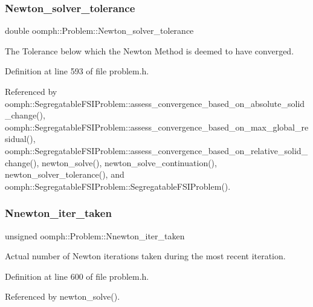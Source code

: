 \subsubsection{\texorpdfstring{Newton\+\_\+solver\+\_\+tolerance}{Newton\_solver\_tolerance}}
{\footnotesize\ttfamily double oomph\+::\+Problem\+::\+Newton\+\_\+solver\+\_\+tolerance\hspace{0.3cm}{\ttfamily [protected]}}



The Tolerance below which the Newton Method is deemed to have converged. 



Definition at line 593 of file problem.\+h.



Referenced by oomph\+::\+Segregatable\+F\+S\+I\+Problem\+::assess\+\_\+convergence\+\_\+based\+\_\+on\+\_\+absolute\+\_\+solid\+\_\+change(), oomph\+::\+Segregatable\+F\+S\+I\+Problem\+::assess\+\_\+convergence\+\_\+based\+\_\+on\+\_\+max\+\_\+global\+\_\+residual(), oomph\+::\+Segregatable\+F\+S\+I\+Problem\+::assess\+\_\+convergence\+\_\+based\+\_\+on\+\_\+relative\+\_\+solid\+\_\+change(), newton\+\_\+solve(), newton\+\_\+solve\+\_\+continuation(), newton\+\_\+solver\+\_\+tolerance(), and oomph\+::\+Segregatable\+F\+S\+I\+Problem\+::\+Segregatable\+F\+S\+I\+Problem().

\mbox{\label{classoomph_1_1Problem_a3c05eefd6891808a1ef01e51288e0108}} 
\subsubsection{\texorpdfstring{Nnewton\+\_\+iter\+\_\+taken}{Nnewton\_iter\_taken}}
{\footnotesize\ttfamily unsigned oomph\+::\+Problem\+::\+Nnewton\+\_\+iter\+\_\+taken\hspace{0.3cm}{\ttfamily [protected]}}



Actual number of Newton iterations taken during the most recent iteration. 



Definition at line 600 of file problem.\+h.



Referenced by newton\+\_\+solve().

